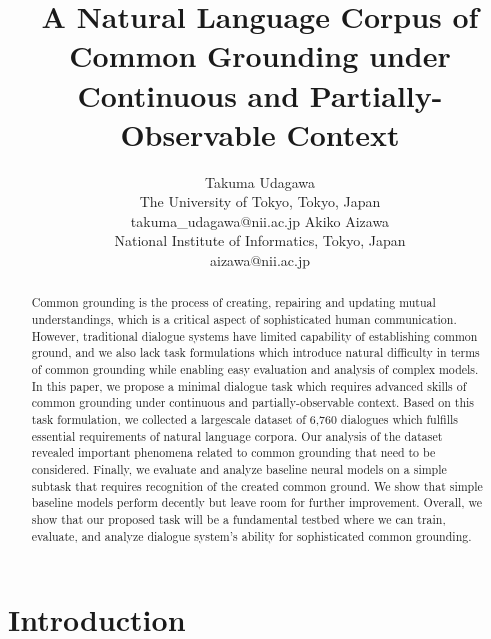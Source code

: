 \documentclass[letterpaper]{article} %
\title{A Natural Language Corpus of Common Grounding under \\ Continuous and Partially-Observable Context}
\author{Takuma Udagawa\\
{The University of Tokyo, Tokyo, Japan}\\
{takuma\_udagawa@nii.ac.jp}
\And
Akiko Aizawa\\
{National Institute of Informatics, Tokyo, Japan}\\
{aizawa@nii.ac.jp}
}
\begin{document}
\maketitle
\begin{abstract}
Common grounding is the process of creating, repairing and updating mutual understandings, which is a critical aspect of sophisticated human communication. However, traditional dialogue systems have limited capability of establishing common ground, and we also lack task formulations which introduce natural difficulty in terms of common grounding while enabling easy evaluation and analysis of complex models. In this paper, we propose a minimal dialogue task which requires advanced skills of common grounding under continuous and partially-observable context. Based on this task formulation, we collected a largescale dataset of 6,760 dialogues which fulfills essential requirements of natural language corpora. Our analysis of the dataset revealed important phenomena related to common grounding that need to be considered. Finally, we evaluate and analyze baseline neural models on a simple subtask that requires recognition of the created common ground. We show that simple baseline models perform decently but leave room for further improvement. Overall, we show that our proposed task will be a fundamental testbed where we can train, evaluate, and analyze dialogue system's ability for sophisticated common grounding.
\end{abstract}

\section{Introduction}
\label{section:introduction}
\end{document}
